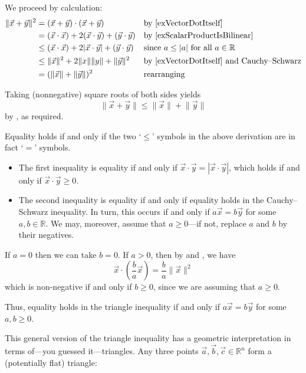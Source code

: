 \begin{cproof}
We proceed by calculation:
\begin{align*}
\lVert \vec x + \vec y \rVert^2
&= (\vec x + \vec y) \cdot (\vec x + \vec y) && \text{by \Cref{exVectorDotItself}} \\
&= (\vec x \cdot \vec x) + 2(\vec x \cdot \vec y) + (\vec y \cdot \vec y) && \text{by \Cref{exScalarProductIsBilinear}} \\
&\le (\vec x \cdot \vec x) + 2|\vec x \cdot \vec y| + (\vec y \cdot \vec y) && \text{since $a \le |a|$ for all $a \in \mathbb{R}$} \\
&\le \lVert \vec x \rVert^2 + 2\lVert x \rVert \lVert y \rVert + \lVert \vec y \rVert^2 && \text{by \Cref{exVectorDotItself} and Cauchy--Schwarz} \\
&= (\lVert \vec x \rVert + \lVert \vec y \rVert)^2 && \text{rearranging}
\end{align*}

Taking (nonnegative) square roots of both sides yields
\[ \lVert \vec x + \vec y \rVert \le \lVert \vec x \rVert + \lVert \vec y \rVert \]
by , as required.

Equality holds if and only if the two `$\le$' symbols in the above derivation are in fact `$=$' symbols.
\begin{itemize}
\item The first inequality is equality if and only if $\vec x \cdot \vec y = |\vec x \cdot \vec y|$, which holds if and only if $\vec x \cdot \vec y \ge 0$.
\item The second inequality is equality if and only if equality holds in the Cauchy--Schwarz inequality. In turn, this occurs if and only if $a\vec x = b \vec y$ for some $a,b \in \mathbb{R}$. We may, moreover, assume that $a \ge 0$---if not, replace $a$ and $b$ by their negatives.
\end{itemize}
If $a=0$ then we can take $b=0$. If $a>0$, then by  and , we have
\[ \vec x \cdot \left( \frac{b}{a} \vec x \right) = \frac{b}{a} \lVert \vec x \rVert^2 \]
which is non-negative if and only if $b \ge 0$, since we are assuming that $a \ge 0$.

Thus, equality holds in the triangle inequality if and only if $a\vec x = b\vec y$ for some $a,b \ge 0$.
\end{cproof}

This general version of the triangle inequality has a geometric interpretation in terms of---you guessed it---triangles. Any three points $\vec a, \vec b, \vec c \in \mathbb{R}^n$ form a (potentially flat) triangle:

